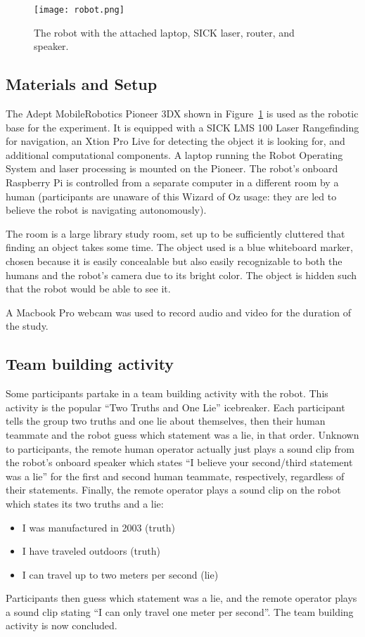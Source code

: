\documentclass{acm_proc_article-sp}
\begin{document}
\begin{figure}[here]
\texttt{[image: robot.png]}
\caption{The robot with the attached laptop, SICK laser, router, and speaker.}
\label{fig:robot}
\end{figure}

\subsection{Materials and Setup}
The Adept MobileRobotics Pioneer 3DX shown in Figure~\ref{fig:robot} is used as the robotic base for the experiment. It is equipped with a SICK LMS 100 Laser Rangefinding for navigation, an Xtion Pro Live for detecting the object it is looking for, and additional computational components. A laptop running the Robot Operating System and laser processing is mounted on the Pioneer. The robot's onboard Raspberry Pi is controlled from a separate computer in a different room by a human (participants are unaware of this Wizard of Oz usage: they are led to believe the robot is navigating autonomously).

The room is a large library study room, set up to be sufficiently cluttered that finding an object takes some time. The object used is a blue whiteboard marker, chosen because it is easily concealable but also easily recognizable to both the humans and the robot's camera due to its bright color. The object is hidden such that the robot would be able to see it.

A Macbook Pro webcam was used to record audio and video for the duration of the study. 
\subsection{Team building activity}
\label{section:team-building-activity}
Some participants partake in a team building activity with the robot. This activity is the popular ``Two Truths and One Lie'' icebreaker. Each participant tells the group two truths and one lie about themselves, then their human teammate and the robot guess which statement was a lie, in that order. Unknown to participants, the remote human operator actually just plays a sound clip from the robot's onboard speaker which states ``I believe your second/third statement was a lie'' for the first and second human teammate, respectively, regardless of their statements. Finally, the remote operator plays a sound clip on the robot which states its two truths and a lie:
\begin{itemize}
 \item I was manufactured in 2003 (truth)
 \item I have traveled outdoors (truth)
 \item I can travel up to two meters per second (lie)
\end{itemize}
Participants then guess which statement was a lie, and the remote operator plays a sound clip stating ``I can only travel one meter per second''. The team building activity is now concluded.
\end{document}
